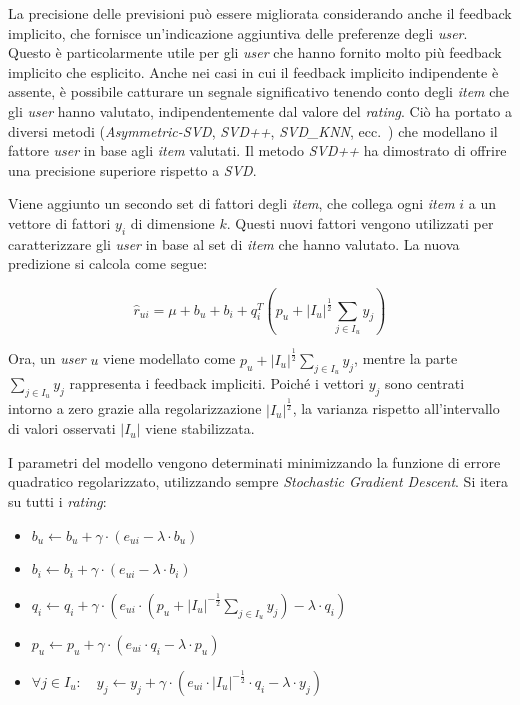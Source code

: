 La precisione delle previsioni può essere migliorata considerando anche il feedback implicito, che fornisce un'indicazione aggiuntiva delle preferenze degli \textit{user}. Questo è particolarmente utile per gli \textit{user} che hanno fornito molto più feedback implicito che esplicito. Anche nei casi in cui il feedback implicito indipendente è assente, è possibile catturare un segnale significativo tenendo conto degli \textit{item} che gli \textit{user} hanno valutato, indipendentemente dal valore del \textit{rating}. Ciò ha portato a diversi metodi (\textit{Asymmetric-SVD}, \textit{SVD++}, \textit{SVD\_KNN}, ecc.~\cite{SVD++, SVD_KNN}) che modellano il fattore \textit{user} in base agli \textit{item} valutati. Il metodo \textit{SVD++} ha dimostrato di offrire una precisione superiore rispetto a \textit{SVD}.

Viene aggiunto un secondo set di fattori degli \textit{item}, che collega ogni \textit{item} $i$ a un vettore di fattori $y_i$ di dimensione $k$. Questi nuovi fattori vengono utilizzati per caratterizzare gli \textit{user} in base al set di \textit{item} che hanno valutato. La nuova predizione si calcola come segue:

\[
\hat{r}_{ui} = \mu + b_u + b_i + q_i^T \left(p_u + |I_u|^{\frac{1}{2}} \sum\limits_{j \in I_u} y_j \right)
\]

Ora, un \textit{user} $u$ viene modellato come $p_u + |I_u|^{\frac{1}{2}} \sum\limits_{j \in I_u} y_j$, mentre la parte $\sum\limits_{j \in I_u} y_j$ rappresenta i feedback impliciti. Poiché i vettori $y_j$ sono centrati intorno a zero grazie alla regolarizzazione $|I_u|^{\frac{1}{2}}$, la varianza rispetto all'intervallo di valori osservati $|I_u|$ viene stabilizzata.

I parametri del modello vengono determinati minimizzando la funzione di errore quadratico regolarizzato, utilizzando sempre \textit{Stochastic Gradient Descent}. Si itera su tutti i \textit{rating}:

\begin{itemize}
  \item $b_u \leftarrow b_u + \gamma \cdot (e_{ui} - \lambda \cdot b_u)$
  \item $b_i \leftarrow b_i + \gamma \cdot (e_{ui} - \lambda \cdot b_i)$
  \item $q_i \leftarrow q_i + \gamma \cdot \left( e_{ui} \cdot \left( p_u + |I_u|^{-\frac{1}{2}} \sum\limits_{j \in I_u} y_j \right) - \lambda \cdot q_i \right)$
  \item $p_u \leftarrow p_u + \gamma \cdot (e_{ui} \cdot q_i - \lambda \cdot p_u)$
  \item $\forall j \in I_u: \quad y_j \leftarrow y_j + \gamma \cdot \left( e_{ui} \cdot |I_u|^{-\frac{1}{2}} \cdot q_i - \lambda \cdot y_j \right)$
\end{itemize}

